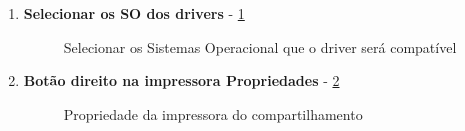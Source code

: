 \begin{enumerate}
	\item \textbf{Selecionar os SO dos drivers} - \ref{selecionar_so}
	\begin{figure}[ht]
	   	\centering
	   	\caption{Selecionar os Sistemas Operacional que o driver será compatível}
	    \label{selecionar_so}
	\end{figure}
	
	\item \textbf{Botão direito na impressora Propriedades} - \ref{propriedade_impressora}
	\begin{figure}[ht]
	   	\centering
	   	\caption{Propriedade da impressora do compartilhamento}
	    \label{propriedade_impressora}
	\end{figure}
	

\end{enumerate}
